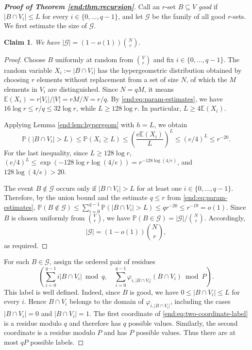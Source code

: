 \documentclass[10pt,a4paper]{amsart}
\numberwithin{equation}{section}
\newtheorem{claim}[theorem]{Claim}
\begin{document}
\begin{proof}[\bfseries{Proof of Theorem \ref{end:thm:recursion}}]
Call an $r$-set $B\subseteq V$ \emph{good} if $|B\cap V_i|\le L$ for every $i\in\{0,\ldots,q-1\}$, 
and let $\mathcal G$ be the family of all good $r$-sets.  
We first estimate the size of $\mathcal G$.  

\begin{claim}\label{claim:eq:good-count}
We have 
$ |\mathcal G|=(1-o(1))\binom Nr.$
\end{claim}

\begin{proof}
Choose $B$ uniformly at random from $\binom Vr$ and fix $i\in\{0,\ldots,q-1\}$.  The random variable $X_i:=|B\cap V_i|$ has the hypergeometric distribution obtained by choosing $r$ elements without replacement from a set of size $N$, of which the $M$ elements in $V_i$ are distinguished.  Since $N=qM$, it means
$\mathbb{E}( X_i)=r|V_i|/|V|=rM/N=r/q$.
By \eqref{end:eq:param-estimates}, we have $16\log r\le r/q\le32\log r$, while $L\ge128\log r$.  
In particular, $L\ge4\mathbb{E}(X_i)$.

Applying Lemma \ref{end:lem:hypergeom} with $h=L$, we obtain
$$ \mathbb{P}(|B\cap V_i|>L)
 \le\mathbb{P}(X_i\ge L)
 \le\left(\frac{e\mathbb{E}(X_i)}{L}\right)^L
 \le(e/4)^L
 \le r^{-20}.$$
For the last inequality, since $L\ge128\log r$,
$(e/4)^L\le\exp(-128\log r\log(4/e))=r^{-128\log(4/e)}$,
and $128\log(4/e)>20$.

The event $B\notin\mathcal G$ occurs only if $|B\cap V_i|>L$ for at least one $i\in\{0,\ldots,q-1\}$.  Therefore, by the union bound and the estimate $q\le r$ from \eqref{end:eq:param-estimates},
$\mathbb{P}(B\notin\mathcal G)\le\sum_{i=0}^{q-1}\mathbb{P}(|B\cap V_i|>L)\le qr^{-20}\le r^{-19}=o(1)$.
Since $B$ is chosen uniformly from $\binom Vr$, we have
$\mathbb{P}(B\in\mathcal G)=|\mathcal G|/\binom Nr$.
Accordingly,
\begin{equation*}
 |\mathcal G|=(1-o(1))\binom Nr,
\end{equation*}
as required.
\end{proof}


For each $B\in\mathcal G$, assign the ordered pair of residues
\begin{equation}\label{end:eq:two-coordinate-label}
 \left(
   \sum_{i=0}^{q-1}i|B\cap V_i|\bmod q,
   \quad
   \sum_{i=0}^{q-1}\varphi_{i,|B\cap V_i|}(B\cap V_i)\bmod P
 \right).
\end{equation}
This label is well defined.  Indeed, since $B$ is good, we have $0\le |B\cap V_i|\le L$ for every $i$.  Hence $B\cap V_i$ belongs to the domain of $\varphi_{i,|B\cap V_i|}$, including the cases $|B\cap V_i|=0$ and $|B\cap V_i|=1$.  The first coordinate of \eqref{end:eq:two-coordinate-label} is a residue modulo $q$ and therefore has $q$ possible values.  Similarly, the second coordinate is a residue modulo $P$ and has $P$ possible values.  Thus there are at most $qP$ possible labels.


\end{proof}
\end{document}
